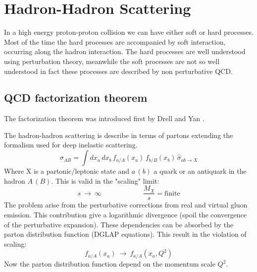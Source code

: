 %
%
%

%


\chapter{Hadron-Hadron Scattering}

In a high energy proton-proton collision we can have either soft or hard processes. Most of the time the hard processes are accompanied by soft interaction, occurring along the hadron interaction.
The hard processes are well understood using perturbation theory, meanwhile the soft processes are not so well understood in fact these processes are described by non perturbative QCD. 

\section{QCD factorization theorem}

The factorization theorem was introduced first by Drell and Yan \cite{DRELL1971578}.

The hadron-hadron scattering is describe in terms of partons extending the formalism used for deep inelastic scattering. 
\begin{equation}
\sigma_{AB}=\displaystyle\int dx_a\,dx_b\,f_{a/A}(x_a)\,f_{b/B}(x_b)\,\hat{\sigma}_{ab \rightarrow X}
\label{eq:factorization1}
\end{equation}
Where X is a partonic/leptonic state and $a\,(b)$ a quark or an antiquark in the hadron $A\,(B)$. This is valid in the "scaling" limit:
\begin{equation}
	s\ \longrightarrow\ \infty \qquad\qquad\qquad \frac{M_X}{s}=\text{finite}
\end{equation}
The problem arise from the perturbative corrections from real and virtual gluon emission. This contribution give a logarithmic divergence (spoil the convergence of the perturbative expansion). These dependencies can be absorbed by the parton distribution function (DGLAP equations). This result in the violation of scaling:
\begin{equation}
	f_{a/A}(x_a)\ \longrightarrow\ f_{a/A}(x_a, Q^2)
\end{equation}  
Now the parton distribution function depend on the momentum scale $Q^2$. 


